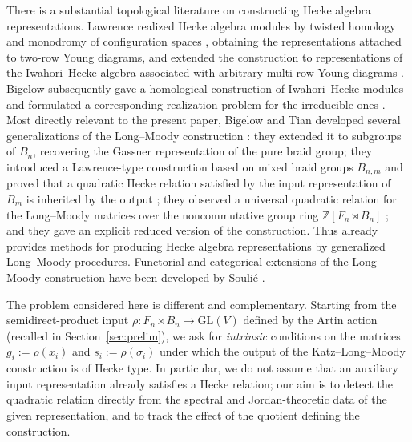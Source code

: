 \documentclass[11pt]{article}
\theoremstyle{definition}
\theoremstyle{remark}
\newcommand{\GL}{\mathrm{GL}}
\begin{document}
There is a substantial topological literature on constructing Hecke
algebra representations. Lawrence realized Hecke algebra modules by
twisted homology and monodromy of configuration spaces
\cite{Lawrence90, Lawrence93}, obtaining the representations attached to
two-row Young diagrams, and extended the construction to representations of the Iwahori--Hecke
algebra associated with arbitrary multi-row Young diagrams
\cite{Lawrence96}. Bigelow
subsequently gave a homological construction of Iwahori--Hecke modules
and formulated a corresponding realization problem for the irreducible
ones \cite{Bigelow04}. Most directly relevant to the present paper,
Bigelow and Tian developed several generalizations of the Long--Moody
construction \cite{BigelowTian08}: they extended it to subgroups of
$B_n$, recovering the Gassner representation of the pure braid group;
they introduced a Lawrence-type construction based on mixed braid
groups $B_{n,m}$ and proved that a quadratic Hecke relation satisfied by
the input representation of $B_m$ is inherited by the output
\cite[Theorem 5.4]{BigelowTian08}; they observed a universal quadratic
relation for the Long--Moody matrices over the noncommutative group ring
$\mathbb{Z}[F_n \rtimes B_n]$ \cite[Proposition 5.1]{BigelowTian08}; and
they gave an explicit reduced version of the construction. Thus
\cite{BigelowTian08} already provides methods for producing Hecke
algebra representations by generalized Long--Moody procedures.
Functorial and categorical extensions of the Long--Moody construction
have been developed by Souli\'e \cite{Soulie19}.

The problem considered here is different and complementary. Starting
from the semidirect-product input
$\rho \colon F_n \rtimes B_n \to \GL(V)$ defined by the Artin action
(recalled in Section~\ref{sec:prelim}), we ask for \emph{intrinsic}
conditions on the matrices $g_i := \rho(x_i)$ and $s_i := \rho(\sigma_i)$
under which the output of the Katz--Long--Moody construction is of Hecke
type. In particular, we do not assume that an auxiliary input
representation already satisfies a Hecke relation; our aim is to detect
the quadratic relation directly from the spectral and Jordan-theoretic
data of the given representation, and to track the effect of the
quotient defining the construction.
\end{document}
